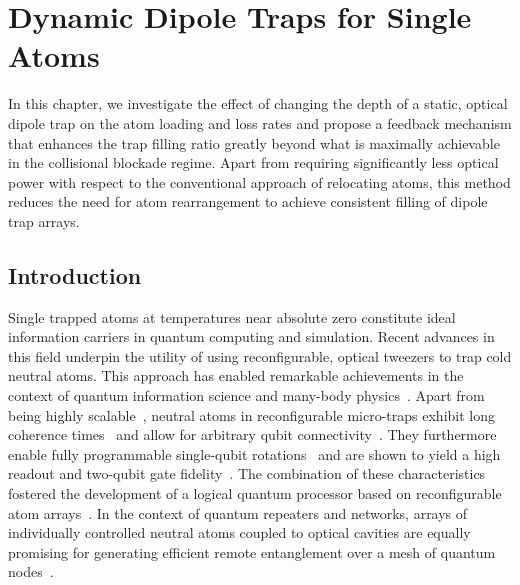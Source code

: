 \documentclass[../Thesis-IJspeert.tex]{subfiles}
\begin{document}
\graphicspath{ {"Dynamic Dipole Traps for Single Atoms/figs/"} }

\chapter{Dynamic Dipole Traps for Single Atoms}
\label{chap:DynamicDipoleTrapsforSingleAtoms}

In this chapter, we investigate the effect of changing the depth of a static, optical dipole trap on the atom loading and loss rates and propose a feedback mechanism that enhances the trap filling ratio greatly beyond what is maximally achievable in the collisional blockade regime. Apart from requiring significantly less optical power with respect to the conventional approach of relocating atoms, this method reduces the need for atom rearrangement to achieve consistent filling of dipole trap arrays. 

\section{Introduction}

Single trapped atoms at temperatures near absolute zero constitute ideal information carriers in quantum computing and simulation. Recent advances in this field underpin the utility of using reconfigurable, optical tweezers to trap cold neutral atoms. This approach has enabled remarkable achievements in the context of quantum information science and many-body physics~\cite{Labuhn2016, Endres2016, Bernien2017, Lienhard2018, Barredo2018}. Apart from being highly scalable~\cite{Manetsch2024}, neutral atoms in reconfigurable micro-traps exhibit long coherence times~\cite{Norcia2019,Wu2019,Young2020} and allow for arbitrary qubit connectivity~\cite{Beugnon2007,Bluvstein2022}. They furthermore enable fully programmable single-qubit rotations~\cite{Ma2023} and are shown to yield a high readout and two-qubit gate fidelity~\cite{Evered2023}. The combination of these characteristics fostered the development of a logical quantum processor based on reconfigurable atom arrays~\cite{Bluvstein2023}. In the context of quantum repeaters and networks, arrays of individually controlled neutral atoms coupled to optical cavities are equally promising for generating efficient remote entanglement over a mesh of quantum nodes~\cite{Wilk2007, rempe2012, Daiss2021, Covey2023}. 
\end{document}
